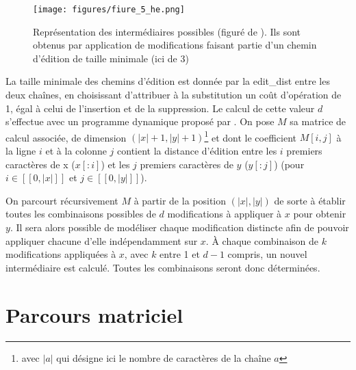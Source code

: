 \documentclass[12pt, twoside]{report}
\begin{document}
\begin{figure}[!h]
    \centering
    \texttt{[image: figures/fiure\_5\_he.png]}
    \caption{Représentation des intermédiaires possibles (figuré de \cite{he2022neural}). Ils sont obtenus par application de modifications faisant partie d'un chemin d'édition de taille minimale (ici de 3)}
    \label{fig:illustratin_he}
\end{figure}

La taille minimale des chemins d'édition est donnée par la \gls{edit_dist} entre les deux chaînes, en choisissant d'attribuer à la substitution un coût d'opération de 1, égal à celui de l'insertion et de la suppression. Le calcul de cette valeur $d$ s'effectue avec un programme dynamique proposé par \cite{levenshtein}. On pose $M$ sa matrice de calcul associée, de dimension $(|x|+1, |y|+1)$\footnote{avec $|a|$ qui désigne ici le nombre de caractères de la chaîne $a$} et dont le coefficient $M[i,j]$ à la ligne $i$ et à la colonne $j$ contient la distance d'édition entre les $i$ premiers caractères de x ($x[:i]$) et les $j$ premiers caractères de $y$ ($y[:j]$) (pour $i \in [\![0,|x|]\!]$ et $j \in [\![0,|y|]\!]$). 

On parcourt récursivement $M$ à partir de la position $(|x|, |y|)$ de sorte à établir toutes les combinaisons possibles de $d$ modifications à appliquer à $x$ pour obtenir $y$. Il sera alors possible de modéliser chaque modification distincte afin de pouvoir appliquer chacune d'elle indépendamment sur $x$. À chaque combinaison de $k$ modifications appliquées à $x$, avec $k$ entre 1 et $d-1$ compris, un nouvel intermédiaire est calculé. Toutes les combinaisons seront donc déterminées.

\section{Parcours matriciel}
\end{document}
